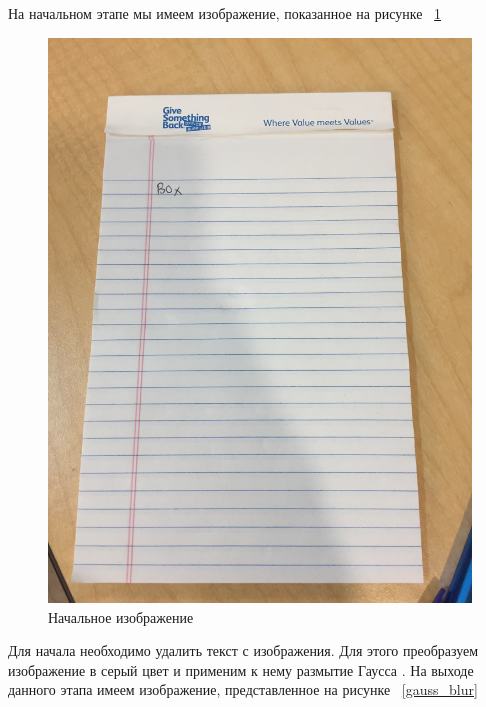 На начальном этапе мы имеем изображение, показанное на рисунке ~\ref{input}

\begin{figure}
    \includegraphics[scale=0.10]{img/perspective/input.JPG}
    \caption{Начальное изображение}
    \label{input}
\end{figure}

Для начала необходимо удалить текст с изображения. Для этого преобразуем изображение в серый цвет и применим к нему размытие Гаусса \cite{gauss_blur}. На выходе данного этапа имеем изображение, представленное на рисунке ~\ref{gauss_blur}

